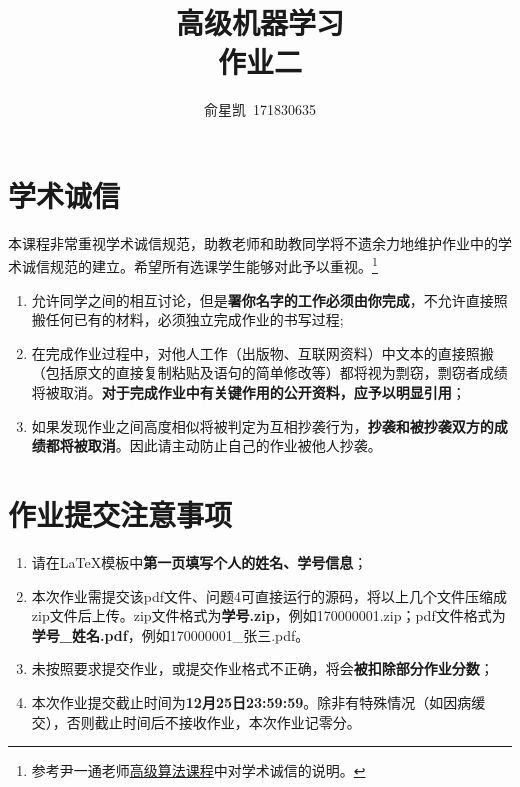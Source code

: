 \documentclass[a4paper,UTF8]{article}
\numberwithin{equation}{section}
\begin{document}
\title{高级机器学习\\
作业二}
\author{俞星凯\, 171830635} 
\maketitle

\section*{学术诚信}

本课程非常重视学术诚信规范，助教老师和助教同学将不遗余力地维护作业中的学术诚信规范的建立。希望所有选课学生能够对此予以重视。\footnote{参考尹一通老师\href{http://tcs.nju.edu.cn/wiki/}{高级算法课程}中对学术诚信的说明。}

\begin{tcolorbox}
	\begin{enumerate}
		\item[(1)] 允许同学之间的相互讨论，但是{\color{red}\textbf{署你名字的工作必须由你完成}}，不允许直接照搬任何已有的材料，必须独立完成作业的书写过程;
		\item[(2)] 在完成作业过程中，对他人工作（出版物、互联网资料）中文本的直接照搬（包括原文的直接复制粘贴及语句的简单修改等）都将视为剽窃，剽窃者成绩将被取消。{\color{red}\textbf{对于完成作业中有关键作用的公开资料，应予以明显引用}}；
		\item[(3)] 如果发现作业之间高度相似将被判定为互相抄袭行为，{\color{red}\textbf{抄袭和被抄袭双方的成绩都将被取消}}。因此请主动防止自己的作业被他人抄袭。
	\end{enumerate}
\end{tcolorbox}

\section*{作业提交注意事项}
\begin{tcolorbox}
	\begin{enumerate}
		\item[(1)] 请在LaTeX模板中{\color{red}\textbf{第一页填写个人的姓名、学号信息}}；
		\item[(2)] 本次作业需提交该pdf文件、问题4可直接运行的源码，将以上几个文件压缩成zip文件后上传。zip文件格式为{\color{red}\textbf{学号.zip}}，例如170000001.zip；pdf文件格式为{\color{red}\textbf{学号\_姓名.pdf}}，例如170000001\_张三.pdf。
		\item[(3)] 未按照要求提交作业，或提交作业格式不正确，将会{\color{red}\textbf{被扣除部分作业分数}}；
		\item[(4)] 本次作业提交截止时间为{\color{red}\textbf{12月25日23:59:59}}。除非有特殊情况（如因病缓交），否则截止时间后不接收作业，本次作业记零分。
	\end{enumerate}
\end{tcolorbox}
\end{document}
